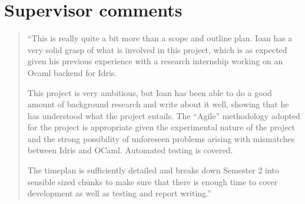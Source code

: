 \documentclass[a4paper]{report}
\begin{document}
\section{Supervisor comments}

\begin{quote}
``This is really quite a bit more than a scope and outline plan. Ioan
has a very solid grasp of what is involved in this project, which is
as expected given his previous experience with a research internship
working on an Ocaml backend for Idris.

This project is very ambitious, but Ioan has been able to do a good
amount of background research and write about it well, showing that he
has understood what the project entails. The ``Agile'' methodology
adopted for the project is appropriate given the experimental nature
of the project and the strong possibility of unforeseen problems
arising with mismatches between Idris and OCaml. Automated testing is
covered.

The timeplan is sufficiently detailed and breaks down Semester 2 into
sensible sized chunks to make sure that there is enough time to cover
development as well as testing and report writing.''
\end{quote}





% 
% 
\end{document}
